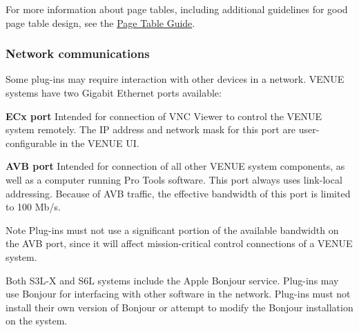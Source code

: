  For more information about page tables, including additional guidelines for good page table design, see the \hyperlink{a00363}{Page Table Guide}.

\hypertarget{a00377_aax_venue_guide__environment__network}{}\subsubsection{Network communications}\label{a00377_aax_venue_guide__environment__network}
 Some plug-\/ins may require interaction with other devices in a network. V\+E\+N\+U\+E systems have two Gigabit Ethernet ports available\+: 
\begin{DoxyEnumerate}
\item {\bfseries E\+Cx port} Intended for connection of V\+N\+C Viewer to control the V\+E\+N\+U\+E system remotely. The I\+P address and network mask for this port are user-\/configurable in the V\+E\+N\+U\+E U\+I. 
\item {\bfseries A\+V\+B port} Intended for connection of all other V\+E\+N\+U\+E system components, as well as a computer running Pro Tools software. This port always uses link-\/local addressing. Because of A\+V\+B traffic, the effective bandwidth of this port is limited to 100 Mb/s. \begin{DoxyNote}{Note}
Plug-\/ins must not use a significant portion of the available bandwidth on the A\+V\+B port, since it will affect mission-\/critical control connections of a V\+E\+N\+U\+E system. 
\end{DoxyNote}

\end{DoxyEnumerate}

 Both S3\+L-\/\+X and S6\+L systems include the Apple Bonjour service. Plug-\/ins may use Bonjour for interfacing with other software in the network. Plug-\/ins must not install their own version of Bonjour or attempt to modify the Bonjour installation on the system.

